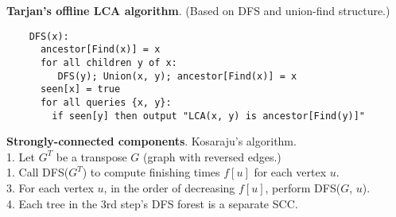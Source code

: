 \documentclass[a4paper, 12pt]{article}
\let\le=\leqslant
\newcommand{\Topic}[1]{\textbf{#1}}
\begin{document}
\Topic{Tarjan's offline LCA algorithm}. (Based on DFS and union-find structure.)
\vspace{-5mm}
\begin{verbatim}
    DFS(x):
      ancestor[Find(x)] = x
      for all children y of x:
         DFS(y); Union(x, y); ancestor[Find(x)] = x
      seen[x] = true
      for all queries {x, y}:
        if seen[y] then output "LCA(x, y) is ancestor[Find(y)]"
\end{verbatim}

%
%

%


\Topic{Strongly-connected components}. Kosaraju's algorithm. \\
1. Let $G^T$ be a transpose $G$ (graph with reversed edges.) \\
1. Call DFS($G^T$) to compute finishing times $f[u]$ for each vertex $u$. \\
3. For each vertex $u$, in the order of decreasing $f[u]$, perform DFS($G$, $u$). \\
4. Each tree in the 3rd step's DFS forest is a separate SCC.
\end{document}
